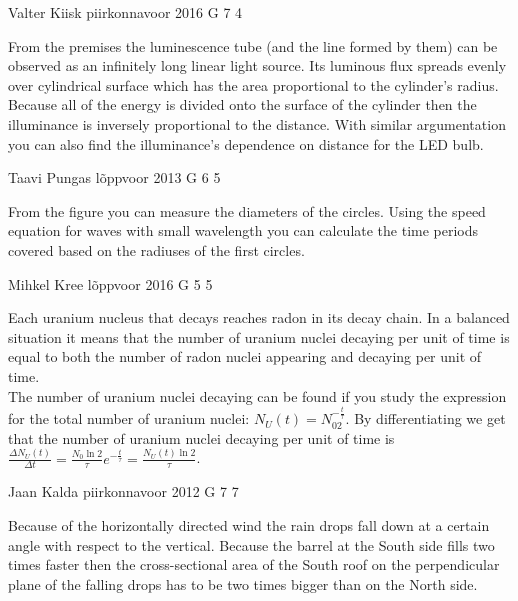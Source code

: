 \documentclass[11pt]{article}
\begin{document}
{Valter Kiisk} %
{piirkonnavoor} %
{2016} %
{G 7} %
{4} %
{

\ifEngHint
From the premises the luminescence tube (and the line formed by them) can be observed as an infinitely long linear light source. Its luminous flux spreads evenly over cylindrical surface which has the area proportional to the cylinder’s radius. Because all of the energy is divided onto the surface of the cylinder then the illuminance is inversely proportional to the distance. With similar argumentation you can also find the illuminance’s dependence on distance for the LED bulb.
\fi
}

{Taavi Pungas} %
{lõppvoor} %
{2013} %
{G 6} %
{5} %
{

\ifEngHint
From the figure you can measure the diameters of the circles. Using the speed equation for waves with small wavelength you can calculate the time periods covered based on the radiuses of the first circles.
\fi
}

{Mihkel Kree} %
{lõppvoor} %
{2016} %
{G 5} %
{5} %
{

\ifEngHint
Each uranium nucleus that decays reaches radon in its decay chain. In a balanced situation it means that the number of uranium nuclei decaying per unit of time is equal to both the number of radon nuclei appearing and decaying per unit of time.\\
The number of uranium nuclei decaying can be found if you study the expression for the total number of uranium nuclei: $N_U(t) = N_02^{-\frac{t}{\tau}}$. By differentiating we get that the number of uranium nuclei decaying per unit of time is $\frac{\Delta N_U(t)}{\Delta t} = \frac{N_0\ln 2}{\tau}e^{-\frac{t}{\tau}} = \frac{N_U(t)\ln 2}{\tau}$.
\fi
}

{Jaan Kalda} %
{piirkonnavoor} %
{2012} %
{G 7} %
{7} %
{

\ifEngHint
Because of the horizontally directed wind the rain drops fall down at a certain angle with respect to the vertical. Because the barrel at the South side fills two times faster then the cross-sectional area of the South roof on the perpendicular plane of the falling drops has to be two times bigger than on the North side.
\fi
}
\end{document}
